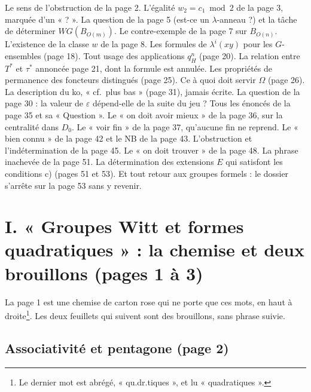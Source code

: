 \documentclass[11pt,a4paper]{article}
\begin{document}
Le sens de l'obstruction de la page 2. L'égalité $w_2 = c_1 \bmod 2$ de la
page 3, marquée d'un « ? ». La question de la page 5 (est-ce un
$\lambda$-anneau ?) et la tâche de déterminer $WG(B_{O(m)})$. Le
contre-exemple de la page 7 sur $B_{O(n)}$. L'existence de la classe $w$ de
la page 8. Les formules de $\lambda^{i}(xy)$ pour les $G$-ensembles (page
18). Tout usage des applications $q^{n}_H$ (page 20). La relation entre
$T^{*}$ et $\tau^{*}$ annoncée page 21, dont la formule est annulée. Les
propriétés de permanence des foncteurs distingués (page 25). Ce à quoi doit
servir $\Omega$ (page 26). La description du ko, « cf.\ plus
bas » (page 31), jamais écrite. La question de la page 30 : la valeur de
$\varepsilon$ dépend-elle de la suite du jeu ? Tous les énoncés de la page
35 et sa « Question ». Le « on doit avoir mieux » de la page 36, sur la centralité dans $D_0$. Le « voir fin »
de la page 37, qu'aucune fin ne reprend. Le « bien connu » de la page 42 et
le NB de la page 43. L'obstruction et l'indétermination de la page 45. Le
« on doit trouver » de la page 48. La phrase inachevée de la page 51. La
détermination des extensions $E$ qui satisfont les conditions c) (pages 51
et 53). Et tout retour aux groupes formels : le dossier s'arrête sur la
page 53 sans y revenir.

\section*{I. « Groupes Witt et formes quadratiques » : la chemise et deux brouillons (pages 1 à 3)}

La page 1 est une chemise de carton rose qui ne porte que ces mots, en haut à
droite\footnote{Le dernier mot est abrégé, « qu.dr.tiques », et lu
« quadratiques ».}. Les deux feuillets qui suivent sont des brouillons, sans
phrase suivie.

\subsection*{Associativité et pentagone (page 2)}
\end{document}
